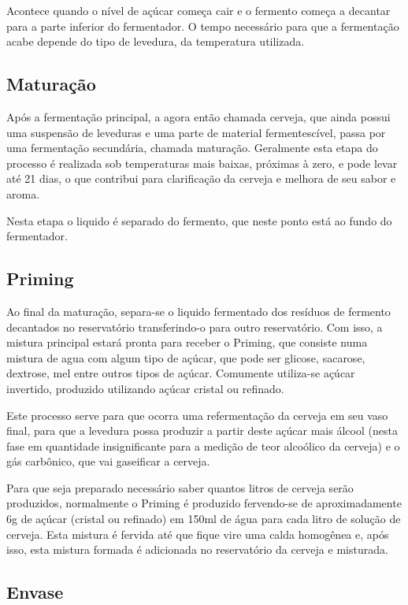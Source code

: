 Acontece quando o nível de açúcar começa cair e o fermento começa a decantar para a parte inferior do fermentador. O tempo necessário para que a fermentação acabe depende do tipo de levedura, da temperatura utilizada.

\subsection{Maturação}

Após a fermentação principal, a agora então chamada cerveja, que ainda possui uma suspensão de leveduras e uma parte de material fermentescível, passa por uma fermentação secundária, chamada maturação. Geralmente esta etapa do processo é realizada sob temperaturas mais baixas, próximas à zero, e pode levar até 21 dias, o que contribui para clarificação da cerveja e melhora de seu sabor e aroma.

Nesta etapa o liquido é separado do fermento, que neste ponto está ao fundo do fermentador.

\subsection{Priming}
Ao final da maturação, separa-se o liquido fermentado dos resíduos de fermento decantados no reservatório transferindo-o para outro reservatório. Com isso, a mistura principal estará pronta para receber o Priming, que consiste numa mistura de agua com algum tipo de açúcar, que pode ser glicose, sacarose, dextrose, mel entre outros tipos de açúcar. Comumente utiliza-se açúcar invertido, produzido utilizando açúcar cristal ou refinado.

Este processo serve para que ocorra uma refermentação da cerveja em seu vaso final, para que a levedura possa produzir a partir deste açúcar mais álcool (nesta fase em quantidade insignificante para a medição de teor alcoólico da cerveja) e o gás carbônico, que vai gaseificar a cerveja.

Para que seja preparado necessário saber quantos litros de cerveja serão produzidos, normalmente o Priming é produzido fervendo-se de aproximadamente 6g de açúcar (cristal ou refinado) em 150ml de água para cada litro de solução de cerveja. Esta mistura é fervida até que fique vire uma calda homogênea e, após isso, esta mistura formada é adicionada no reservatório da cerveja e misturada.

\subsection{Envase}

